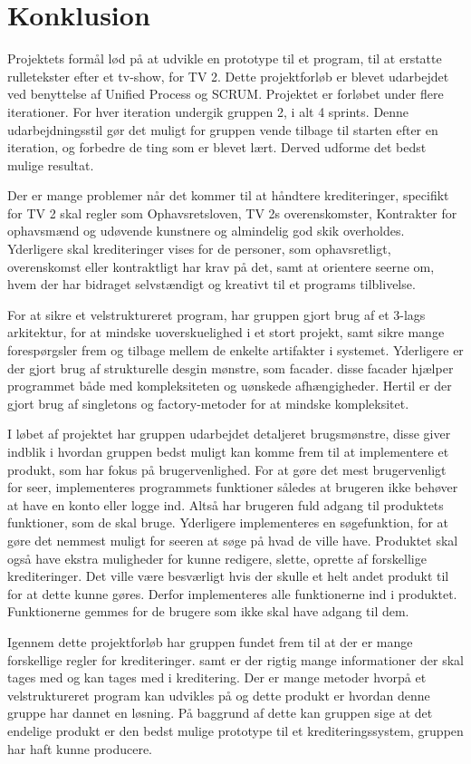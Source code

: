 \section{Konklusion}
Projektets formål lød på at udvikle en prototype til et program, til at erstatte rulletekster efter et tv-show, for TV 2.
Dette projektforløb er blevet udarbejdet ved benyttelse af Unified Process og SCRUM. Projektet er forløbet under flere iterationer. For hver iteration undergik gruppen 2, i alt 4 sprints. Denne udarbejdningsstil gør det muligt for gruppen vende tilbage til starten efter en iteration, og forbedre de ting som er blevet lært. Derved udforme det bedst mulige resultat.

Der er mange problemer når det kommer til at håndtere krediteringer, specifikt for TV 2 skal regler som Ophavsretsloven, TV 2s overenskomster, Kontrakter for ophavsmænd og udøvende kunstnere og almindelig god skik overholdes. Yderligere skal krediteringer vises for de personer, som ophavsretligt, overenskomst eller kontraktligt har krav på det, samt at orientere seerne om, hvem der har bidraget selvstændigt og kreativt til et programs tilblivelse.

For at sikre et velstruktureret program, har gruppen gjort brug af et 3-lags arkitektur, for at mindske uoverskuelighed i et stort projekt, samt sikre mange forespørgsler frem og tilbage mellem de enkelte artifakter i systemet. Yderligere er der gjort brug af strukturelle desgin mønstre, som facader. disse facader hjælper programmet både med kompleksiteten og uønskede afhængigheder. Hertil er der gjort brug af singletons og factory-metoder for at mindske kompleksitet.

I løbet af projektet har gruppen udarbejdet detaljeret brugsmønstre, disse giver indblik i hvordan gruppen bedst muligt kan komme frem til at implementere et produkt, som har fokus på brugervenlighed. For at gøre det mest brugervenligt for seer, implementeres programmets funktioner således at brugeren ikke behøver at have en konto eller logge ind. Altså har brugeren fuld adgang til produktets funktioner, som de skal bruge. Yderligere implementeres en søgefunktion, for at gøre det nemmest muligt for seeren at søge på hvad de ville have. Produktet skal også have ekstra muligheder for kunne redigere, slette, oprette af forskellige krediteringer. Det ville være besværligt hvis der skulle et helt andet produkt til for at dette kunne gøres. Derfor implementeres alle funktionerne ind i produktet. Funktionerne gemmes for de brugere som ikke skal have adgang til dem. 

Igennem dette projektforløb har gruppen fundet frem til at der er mange forskellige regler for krediteringer. samt er der rigtig mange informationer der skal tages med og kan tages med i kreditering. Der er mange metoder hvorpå et velstruktureret program kan udvikles på og dette produkt er hvordan denne gruppe har dannet en løsning. 
På baggrund af dette kan gruppen sige at det endelige produkt er den bedst mulige prototype til et krediteringssystem, gruppen har haft kunne producere.